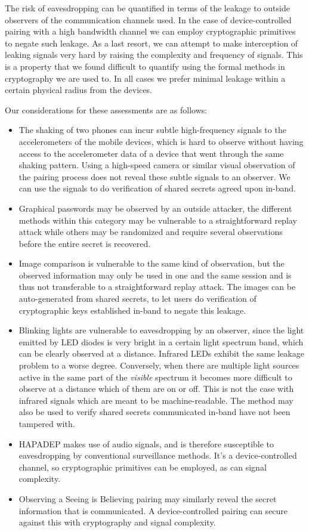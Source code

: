 \documentclass[conference, 11pt]{sty/IEEEtran}
\begin{document}
The risk of eavesdropping can be quantified in terms of the leakage to outside observers of the communication channels used.
In the case of device-controlled pairing with a high bandwidth channel we can employ cryptographic primitives to negate such leakage.
As a last resort, we can attempt to make interception of leaking signals very hard by raising the complexity and frequency of signals.
This is a property that we found difficult to quantify using the formal methods in cryptography we are used to.
In all cases we prefer minimal leakage within a certain physical radius from the devices.

Our considerations for these assessments are as follows:
\begin{itemize}
	\item The shaking of two phones can incur subtle high-frequency signals to the accelerometers of the mobile devices, which is hard to observe without having access to the accelerometer data of a device that went through the same shaking pattern.
	Using a high-speed camera or similar visual observation of the pairing process does not reveal these subtle signals to an observer.
	We can use the signals to do verification of shared secrets agreed upon in-band.
	\item Graphical passwords may be observed by an outside attacker, the different methods within this category may be vulnerable to a straightforward replay attack while others may be randomized and require several observations before the entire secret is recovered.
	\item Image comparison is vulnerable to the same kind of observation, but the observed information may only be used in one and the same session and is thus not transferable to a straightforward replay attack.
	The images can be auto-generated from shared secrets, to let users do verification of cryptographic keys established in-band to negate this leakage.
	\item Blinking lights are vulnerable to eavesdropping by an observer, since the light emitted by LED diodes is very bright in a certain light spectrum band, which can be clearly observed at a distance.
	Infrared LEDs exhibit the same leakage problem to a worse degree.
	Conversely, when there are multiple light sources active in the same part of the \textit{visible} spectrum it becomes more difficult to observe at a distance which of them are on or off. This is not the case with infrared signals which are meant to be machine-readable.
	The method may also be used to verify shared secrets communicated in-band have not been tampered with.
	\item HAPADEP makes use of audio signals, and is therefore susceptible to eavesdropping by conventional surveillance methods. It's a device-controlled channel, so cryptographic primitives can be employed, as can signal complexity.
	\item Observing a Seeing is Believing pairing may similarly reveal the secret information that is communicated. A device-controlled pairing can secure against this with cryptography and signal complexity.
\end{itemize}
\end{document}
